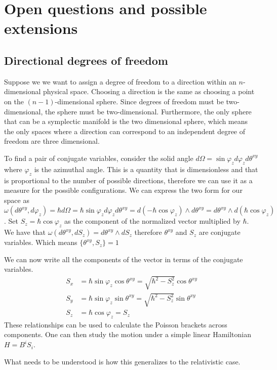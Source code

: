 \documentclass[11pt,letterpaper,fleqn]{memoir} %
\begin{document}
\section{Open questions and possible extensions}

\subsection{Directional degrees of freedom}

Suppose we we want to assign a degree of freedom to a direction within an $n$-dimensional physical space. Choosing a direction is the same as choosing a point on the $(n-1)$-dimensional sphere. Since degrees of freedom must be two-dimensional, the sphere must be two-dimensional. Furthermore, the only sphere that can be a symplectic manifold is the two dimensional sphere, which means the only spaces where a direction can correspond to an independent degree of freedom are three dimensional.

To find a pair of conjugate variables, consider the solid angle $d\Omega=\sin \varphi_z d\varphi_z d\theta^{xy}$ where $\varphi_z$ is the azimuthal angle. This is a quantity that is dimensionless and that is proportional to the number of possible directions, therefore we can use it as a measure for the possible configurations. We can express the two form for our space as $\omega(d\theta^{xy}, d\varphi_z) = \hbar d\Omega = \hbar\sin \varphi_z d\varphi_z d\theta^{xy} = d(- \hbar \cos \varphi_z ) \wedge d\theta^{xy} = d\theta^{xy} \wedge d(\hbar \cos \varphi_z )$. Set $S_z= \hbar \cos \varphi_z$ as the component of the normalized vector multiplied by $\hbar$. We have that $\omega(d\theta^{xy}, dS_z) = d\theta^{xy} \wedge dS_z$ therefore $\theta^{xy}$ and $S_z$ are conjugate variables. Which means $\{ \theta^{xy}, S_z \} = 1$

We can now write all the components of the vector in terms of the conjugate variables.
\begin{align*}
S_x &= \hbar \sin \varphi_z \cos \theta^{xy} = \sqrt{\hbar^2 - S_z^2} \cos \theta^{xy}  \\
S_y &= \hbar \sin \varphi_z \sin \theta^{xy} = \sqrt{\hbar^2 - S_z^2} \sin \theta^{xy}\\
S_z &= \hbar \cos \varphi_z = S_z
\end{align*}
These relationships can be used to calculate the Poisson brackets across components. One can then study the motion under a simple linear Hamiltonian $H = B^i S_i$.

What needs to be understood is how this generalizes to the relativistic case.
\end{document}
